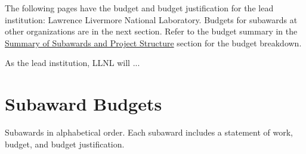 \documentclass[11pt]{article}
\begin{document}
The following pages have the budget and budget justification for the lead institution:
Lawrence Livermore National Laboratory. Budgets for subawards at other organizations are
in the next section. Refer to the budget summary in the
\hyperlink{sec:budget-summary}{Summary of Subawards and Project Structure} section for
the budget breakdown.

As the lead institution, LLNL will ...

%
%


\newpage
\section{Subaward Budgets}

Subawards in alphabetical order. Each subaward includes a statement of work, budget, and
budget justification.


%
%
%

%
%
%
\end{document}

